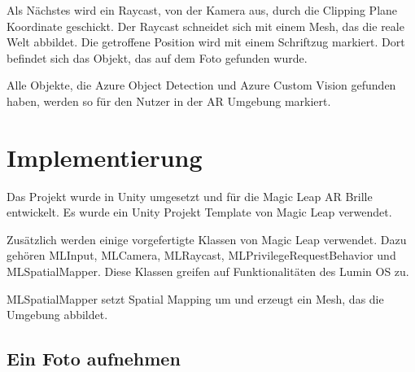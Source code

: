 \documentclass[german,a4paper, 12pt]{llncs}
\begin{document}
Als Nächstes wird ein Raycast, von der Kamera aus, durch die Clipping Plane Koordinate geschickt. Der Raycast schneidet sich mit einem Mesh, das die reale Welt abbildet. Die getroffene Position wird mit einem Schriftzug markiert. Dort befindet sich das Objekt, das auf dem Foto gefunden wurde.

Alle Objekte, die Azure Object Detection und Azure Custom Vision gefunden haben, werden so für den Nutzer in der AR Umgebung markiert.

\section{Implementierung}

Das Projekt wurde in Unity umgesetzt und für die Magic Leap AR Brille entwickelt.
Es wurde ein Unity Projekt Template von Magic Leap verwendet. 

Zusätzlich werden einige vorgefertigte Klassen von Magic Leap verwendet. Dazu gehören MLInput, MLCamera, MLRaycast, MLPrivilegeRequestBehavior und MLSpatialMapper. Diese Klassen greifen auf Funktionalitäten des Lumin OS zu.

MLSpatialMapper setzt Spatial Mapping um und erzeugt ein Mesh, das die Umgebung abbildet.


\subsection{Ein Foto aufnehmen}
\end{document}
